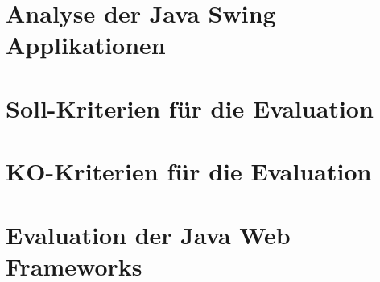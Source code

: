 \documentclass[
11pt, %
a4paper, %
BCOR15mm, %
DIV14, %
footsepline = false, %
headsepline, %
oneside,
openright,
halfparskip, %
abstracton, %
listof=totocnumbered, %
bibliography=totocnumbered %
]{scrreprt}
\begin{document}
  

  \cleardoublepage
   
   
  \chapter{Analyse der Java Swing
  Applikationen}\label{chapter:AnalyseDerJavaSwingApplikationen}
  
  

  \cleardoublepage
  
  
  \chapter{Soll-Kriterien für die
  Evaluation}\label{chapter:SollKriterienFuerDieEvaluation}
  
   
  
  \cleardoublepage
  
  
  \chapter{KO-Kriterien für die
  Evaluation}\label{chapter:koKriterienFuerDieEvaluation}
  
   
  
  \cleardoublepage
  
  
  \chapter{Evaluation der Java Web
  Frameworks}\label{chapter:EvaluationDerJavaWebFrameworks}
  
\end{document}
